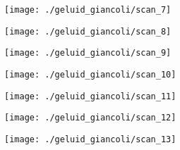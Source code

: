\begin{figure}[h]
\centering
\texttt{[image: ./geluid\_giancoli/scan\_7]}
\end{figure}

\begin{figure}[h]
\centering
\texttt{[image: ./geluid\_giancoli/scan\_8]}
\end{figure}

\begin{figure}[h]
\centering
\texttt{[image: ./geluid\_giancoli/scan\_9]}
\end{figure}

\begin{figure}[h]
\centering
\texttt{[image: ./geluid\_giancoli/scan\_10]}
\end{figure}

\begin{figure}[h]
\centering
\texttt{[image: ./geluid\_giancoli/scan\_11]}
\end{figure}

\begin{figure}[h]
\centering
\texttt{[image: ./geluid\_giancoli/scan\_12]}
\end{figure}


\begin{figure}[h]
\centering
\texttt{[image: ./geluid\_giancoli/scan\_13]}
\end{figure}
\vfill






















